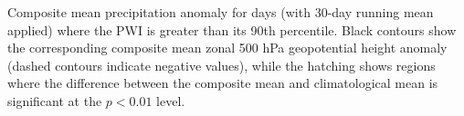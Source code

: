 \label{fig:pr_composite}
Composite mean precipitation anomaly for days (with 30-day running mean applied) where the PWI is greater than its 90th percentile. Black contours show the corresponding composite mean zonal 500 hPa geopotential height anomaly (dashed contours indicate negative values), while the hatching shows regions where the difference between the composite mean and climatological mean is significant at the $p < 0.01$ level.
